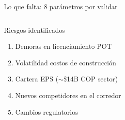 \documentclass[aspectratio=169, 11pt]{beamer}
\begin{document}
{\begin{frame}{Lo que falta: 8 parámetros por validar}
\begin{columns}[T]
\begin{block}{\small Riesgos identificados}
\footnotesize
\begin{enumerate}\scriptsize
  \item Demoras en licenciamiento POT
  \item Volatilidad costos de construcción
  \item Cartera EPS ($\sim$\$14B COP sector)
  \item Nuevos competidores en el corredor
  \item Cambios regulatorios
\end{enumerate}
\end{block}
\end{columns}
\end{frame}
}

\end{document}
